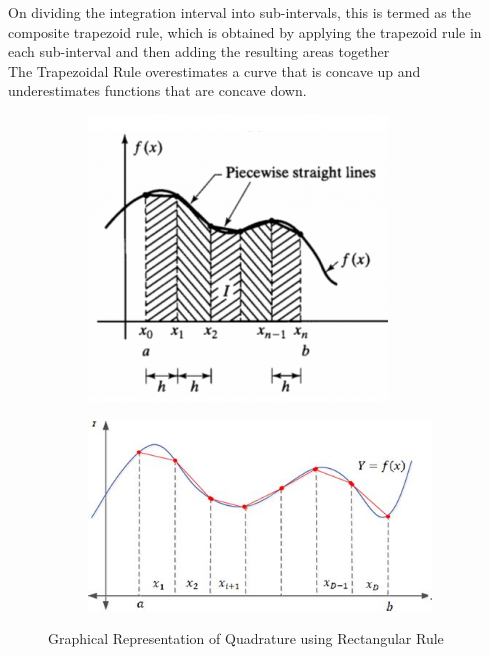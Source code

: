 \documentclass[11pt]{article}
\begin{document}
On dividing the integration interval into sub-intervals, this is termed as the composite trapezoid rule, which is obtained by applying the trapezoid rule in each sub-interval and then adding the resulting areas together\\

The Trapezoidal Rule overestimates a curve that is 
concave up and underestimates functions that are 
concave down.

\begin{figure} [h!]
	\centering
	\begin{subfigure}{0.5\textwidth}
		\centering
		\includegraphics[width=0.8\linewidth]{Sample3}
		\label{fig2:sub2}
	\end{subfigure}%
	\begin{subfigure}{0.5\textwidth}
		\centering
		\includegraphics[width=0.8\linewidth]{Sample4}
		\label{fig2:sub3}
	\end{subfigure}
	\caption{Graphical Representation of Quadrature using Rectangular Rule}
\end{figure}
\vspace{1cm}
\end{document}
